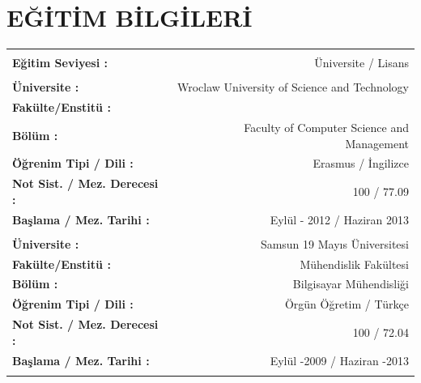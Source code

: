 \documentclass[10pt,a4paper]{article}
\begin{document}
\section{\sc E{\footnotesize Ğ\footnotesize İT\footnotesize İM} B{\footnotesize İLG\footnotesize İLER\footnotesize İ}}
\hspace*{1.6in}\begin{tabular}{lr}
\vspace{0.5 mm}\\
\textbf{Eğitim Seviyesi :} & Üniversite / Lisans \\
\vspace{0.5 mm}\\
\textbf{Üniversite :} & Wroclaw University of Science and Technology \\
\textbf{Fakülte/Enstitü :} &  \\
\textbf{Bölüm :} & Faculty of Computer Science and Management \\
\textbf{Öğrenim Tipi / Dili :} & Erasmus / İngilizce\\
\textbf{Not Sist. / Mez. Derecesi :} & 100 / 77.09 \\
\textbf{Başlama / Mez. Tarihi :} & Eylül  - 2012 / Haziran 2013 \\
\vspace{0.5 mm}\\
\textbf{Üniversite :} & Samsun 19 Mayıs Üniversitesi  \\
\textbf{Fakülte/Enstitü :} & Mühendislik Fakültesi \\
\textbf{Bölüm :} & Bilgisayar Mühendisliği \\
\textbf{Öğrenim Tipi / Dili :} & Örgün Öğretim / Türkçe\\
\textbf{Not Sist. / Mez. Derecesi :} & 100 / 72.04 \\
\textbf{Başlama / Mez. Tarihi :} & Eylül -2009 / Haziran -2013\\
\vspace{0.5 mm}\\
\end{tabular}
\end{document}
